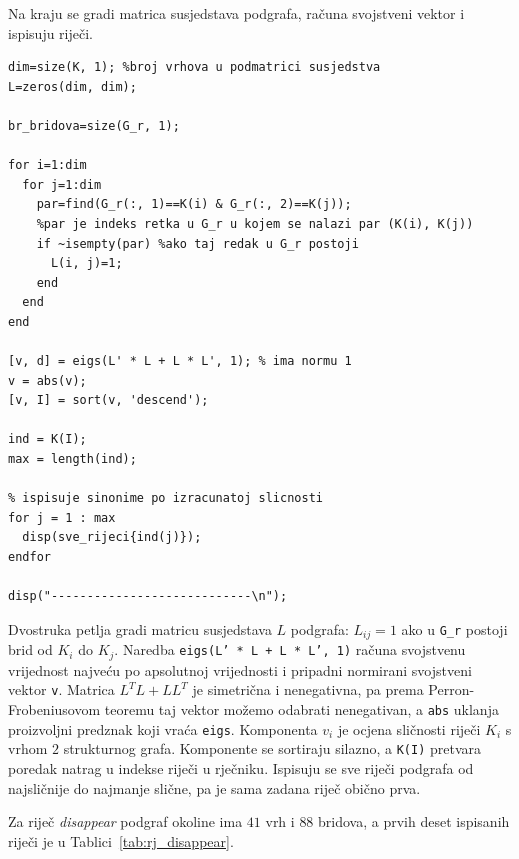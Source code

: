 \documentclass[12pt, letterpaper]{article}
\numberwithin{figure}{section}
\begin{document}
Na kraju se gradi matrica susjedstava podgrafa, računa svojstveni vektor i ispisuju riječi.

\begin{lstlisting}[style=octave, caption={Računanje sličnosti i ispis sinonima}, label={lst:rj_slicnost}]
dim=size(K, 1); %broj vrhova u podmatrici susjedstva
L=zeros(dim, dim);

br_bridova=size(G_r, 1);

for i=1:dim
  for j=1:dim
    par=find(G_r(:, 1)==K(i) & G_r(:, 2)==K(j));
    %par je indeks retka u G_r u kojem se nalazi par (K(i), K(j))
    if ~isempty(par) %ako taj redak u G_r postoji
      L(i, j)=1;
    end
  end
end

[v, d] = eigs(L' * L + L * L', 1); % ima normu 1
v = abs(v);
[v, I] = sort(v, 'descend');

ind = K(I);
max = length(ind);

% ispisuje sinonime po izracunatoj slicnosti
for j = 1 : max
  disp(sve_rijeci{ind(j)});
endfor

disp("----------------------------\n");
\end{lstlisting}
Dvostruka petlja gradi matricu susjedstava $L$ podgrafa: $L_{ij}=1$ ako u \texttt{G\_r} postoji brid od $K_i$ do $K_j$. Naredba \texttt{eigs(L' * L + L * L', 1)} računa svojstvenu vrijednost najveću po apsolutnoj vrijednosti i pripadni normirani svojstveni vektor \texttt{v}. Matrica $L^TL+LL^T$ je simetrična i nenegativna, pa prema Perron-Frobeniusovom teoremu taj vektor možemo odabrati nenegativan, a \texttt{abs} uklanja proizvoljni predznak koji vraća \texttt{eigs}. Komponenta $v_i$ je ocjena sličnosti riječi $K_i$ s vrhom $2$ strukturnog grafa. Komponente se sortiraju silazno, a \texttt{K(I)} pretvara poredak natrag u indekse riječi u rječniku. Ispisuju se sve riječi podgrafa od najsličnije do najmanje slične, pa je sama zadana riječ obično prva.

Za riječ \emph{disappear} podgraf okoline ima $41$ vrh i $88$ bridova, a prvih deset ispisanih riječi je u Tablici~\ref{tab:rj_disappear}.
\end{document}
